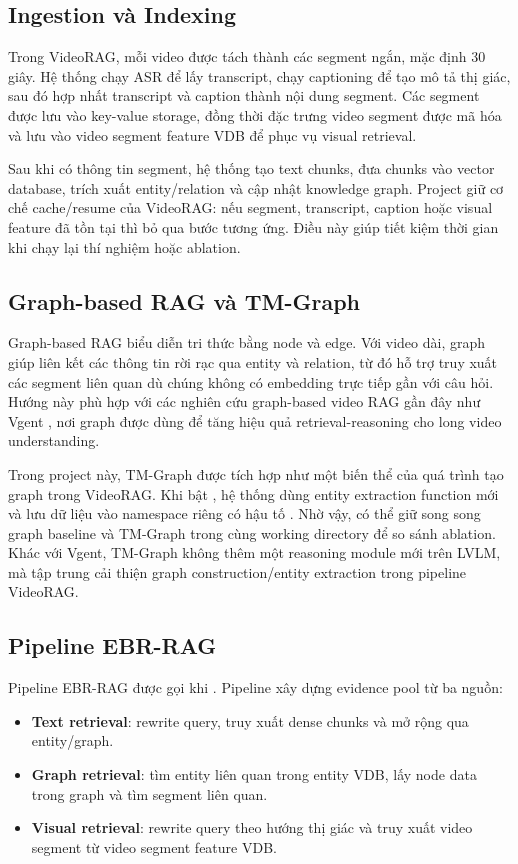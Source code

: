 \documentclass[12pt,a4paper]{article}
\newcommand{\codepath}[1]{\path{#1}}
\begin{document}
\subsection{Ingestion và Indexing}

Trong VideoRAG, mỗi video được tách thành các segment ngắn, mặc định 30 giây. Hệ thống chạy ASR để lấy transcript, chạy captioning để tạo mô tả thị giác, sau đó hợp nhất transcript và caption thành nội dung segment. Các segment được lưu vào key-value storage, đồng thời đặc trưng video segment được mã hóa và lưu vào video segment feature VDB để phục vụ visual retrieval.

Sau khi có thông tin segment, hệ thống tạo text chunks, đưa chunks vào vector database, trích xuất entity/relation và cập nhật knowledge graph. Project giữ cơ chế cache/resume của VideoRAG: nếu segment, transcript, caption hoặc visual feature đã tồn tại thì bỏ qua bước tương ứng. Điều này giúp tiết kiệm thời gian khi chạy lại thí nghiệm hoặc ablation.

\subsection{Graph-based RAG và TM-Graph}

Graph-based RAG biểu diễn tri thức bằng node và edge. Với video dài, graph giúp liên kết các thông tin rời rạc qua entity và relation, từ đó hỗ trợ truy xuất các segment liên quan dù chúng không có embedding trực tiếp gần với câu hỏi. Hướng này phù hợp với các nghiên cứu graph-based video RAG gần đây như Vgent \cite{shen2025vgent}, nơi graph được dùng để tăng hiệu quả retrieval-reasoning cho long video understanding.

Trong project này, TM-Graph được tích hợp như một biến thể của quá trình tạo graph trong VideoRAG. Khi bật \codepath{use_tm_graph=True}, hệ thống dùng entity extraction function mới và lưu dữ liệu vào namespace riêng có hậu tố \codepath{_tm}. Nhờ vậy, có thể giữ song song graph baseline và TM-Graph trong cùng working directory để so sánh ablation. Khác với Vgent, TM-Graph không thêm một reasoning module mới trên LVLM, mà tập trung cải thiện graph construction/entity extraction trong pipeline VideoRAG.

\subsection{Pipeline EBR-RAG}

Pipeline EBR-RAG được gọi khi \codepath{param.mode == "EBR_RAG"}. Pipeline xây dựng evidence pool từ ba nguồn:
\begin{itemize}
  \item \textbf{Text retrieval}: rewrite query, truy xuất dense chunks và mở rộng qua entity/graph.
  \item \textbf{Graph retrieval}: tìm entity liên quan trong entity VDB, lấy node data trong graph và tìm segment liên quan.
  \item \textbf{Visual retrieval}: rewrite query theo hướng thị giác và truy xuất video segment từ video segment feature VDB.
\end{itemize}
\end{document}
